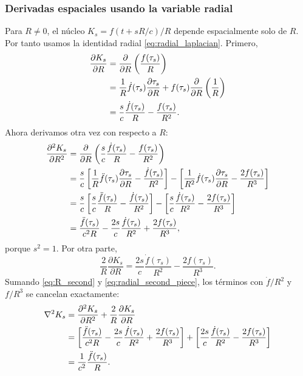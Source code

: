 \documentclass{article}
\numberwithin{equation}{section}
\newcommand{\R}{R}
\begin{document}
\subsubsection{Derivadas espaciales usando la variable radial}

Para \(\R\neq 0\), el núcleo \(K_s=f(t+s\R/c)/\R\) depende espacialmente solo de \(\R\). Por tanto usamos la identidad radial \eqref{eq:radial_laplacian}. Primero,
\begin{align}
    \frac{\partial K_s}{\partial \R}
    &=\frac{\partial}{\partial \R}\left(\frac{f(\tau_s)}{\R}\right) \notag\\
    &=\frac{1}{\R}\dot f(\tau_s)\frac{\partial \tau_s}{\partial \R}
    +f(\tau_s)\frac{\partial}{\partial \R}\left(\frac{1}{\R}\right) \notag\\
    &=\frac{s}{c}\frac{\dot f(\tau_s)}{\R}
    -\frac{f(\tau_s)}{\R^2}.
    \label{eq:R_first}
\end{align}
Ahora derivamos otra vez con respecto a \(\R\):
\begin{align}
    \frac{\partial^2 K_s}{\partial \R^2}
    &=\frac{\partial}{\partial \R}
    \left(
    \frac{s}{c}\frac{\dot f(\tau_s)}{\R}
    -\frac{f(\tau_s)}{\R^2}
    \right) \notag\\
    &=\frac{s}{c}\left[
        \frac{1}{\R}\ddot f(\tau_s)\frac{\partial\tau_s}{\partial\R}
        -\frac{\dot f(\tau_s)}{\R^2}
    \right]
    -\left[
        \frac{1}{\R^2}\dot f(\tau_s)\frac{\partial\tau_s}{\partial\R}
        -\frac{2f(\tau_s)}{\R^3}
    \right] \notag\\
    &=\frac{s}{c}\left[
        \frac{s}{c}\frac{\ddot f(\tau_s)}{\R}
        -\frac{\dot f(\tau_s)}{\R^2}
    \right]
    -\left[
        \frac{s}{c}\frac{\dot f(\tau_s)}{\R^2}
        -\frac{2f(\tau_s)}{\R^3}
    \right] \notag\\
    &=\frac{\ddot f(\tau_s)}{c^2\R}
    -\frac{2s}{c}\frac{\dot f(\tau_s)}{\R^2}
    +\frac{2f(\tau_s)}{\R^3},
    \label{eq:R_second}
\end{align}
porque \(s^2=1\). Por otra parte,
\begin{equation}
    \frac{2}{\R}\frac{\partial K_s}{\partial \R}
    =\frac{2s}{c}\frac{\dot f(\tau_s)}{\R^2}
    -\frac{2f(\tau_s)}{\R^3}.
    \label{eq:radial_second_piece}
\end{equation}
Sumando \eqref{eq:R_second} y \eqref{eq:radial_second_piece}, los términos con \(\dot f/\R^2\) y \(f/\R^3\) se cancelan exactamente:
\begin{align}
    \nabla^2K_s
    &=\frac{\partial^2K_s}{\partial\R^2}
    +\frac{2}{\R}\frac{\partial K_s}{\partial\R} \notag\\
    &=\left[
    \frac{\ddot f(\tau_s)}{c^2\R}
    -\frac{2s}{c}\frac{\dot f(\tau_s)}{\R^2}
    +\frac{2f(\tau_s)}{\R^3}
    \right]
    +\left[
    \frac{2s}{c}\frac{\dot f(\tau_s)}{\R^2}
    -\frac{2f(\tau_s)}{\R^3}
    \right] \notag\\
    &=\frac{1}{c^2}\frac{\ddot f(\tau_s)}{\R}.
    \label{eq:laplacian_kernel_regular}
\end{align}
\end{document}
